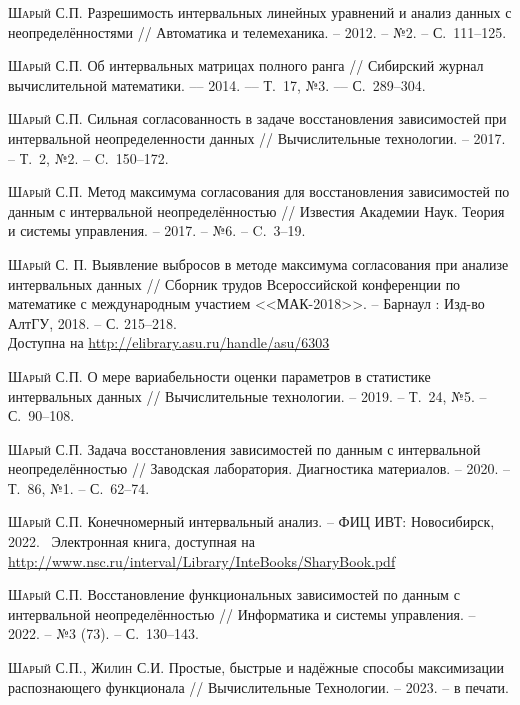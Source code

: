 \documentclass[a5paper,openany]{book}
\begin{document}
\begin{thebibliography}{999}
\textsc{Шарый С.П.} Разрешимость интервальных линейных уравнений и анализ данных 
с неопределённостями // Автоматика и телемеханика. -- 2012. -- №2. -- С.~111--125. 
  
\textsc{Шарый С.П.} Об интервальных матрицах полного ранга // Сибирский журнал 
вычислительной математики. –– 2014. –– Т.~17, №3. –– С.~289--304. 
   
\textsc{Шарый С.П.} Сильная согласованность в задаче восстановления зависимостей 
при интервальной неопределенности данных // Вычислительные технологии. -- 2017. 
-- Т.~2, №2. -- C.~150--172. 
    
\textsc{Шарый С.П.} Метод максимума согласования для восстановления зависимостей 
по данным с интервальной неопределённостью // Известия Академии Наук. Теория и 
системы управления. -- 2017. -- №6. -- C.~3--19. 
  
\textsc{Шарый С. П.} Выявление выбросов в методе максимума согласования при анализе 
интервальных данных // Сборник трудов Всероссийской конференции по математике 
с международным участием <<МАК-2018>>. -- Барнаул : Изд-во АлтГУ, 2018. -- С. 215--218. \\ 
Доступна на \url{http://elibrary.asu.ru/handle/asu/6303}
  
\textsc{Шарый С.П.} О мере вариабельности оценки параметров в статистике интервальных 
данных // Вычислительные технологии. -- 2019. -- Т.~24, №5. -- С.~90--108. 
   
\textsc{Шарый С.П.} Задача восстановления зависимостей по данным с интервальной 
неопределённостью // Заводская лаборатория. Диагностика материалов. -- 2020. 
-- Т.~86, №1. -- С.~62--74. \  
    
\textsc{Шарый С.П.} Конечномерный интервальный анализ. -- ФИЦ ИВТ: 
Новосибирск, 2022. \     Электронная книга, доступная 
на \url{http://www.nsc.ru/interval/Library/InteBooks/SharyBook.pdf} 
  
\textsc{Шарый С.П.} Восстановление функциональных зависимостей по данным с интервальной 
неопределённостью // Информатика и системы управления. -- 2022. -- №3 (73). -- 
С.~130--143. 
  
\textsc{Шарый С.П., Жилин С.И.} Простые, быстрые и надёжные способы максимизации 
распознающего функционала // Вычислительные Технологии. -- 2023. -- в печати. 
  

\end{thebibliography}
\end{document}
